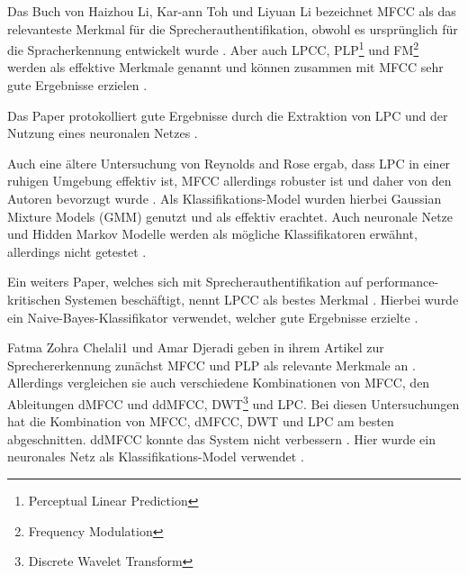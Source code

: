 Das Buch  von Haizhou Li, Kar-ann Toh und Liyuan Li bezeichnet \ac{MFCC} als das relevanteste Merkmal für die Sprecherauthentifikation, obwohl es ursprünglich für die Spracherkennung entwickelt wurde \autocite[vgl.][S. 7, 51]{li_advanced_2011}.
Aber auch \ac{LPCC}, PLP\footnote{Perceptual Linear Prediction} und FM\footnote{Frequency Modulation} werden als effektive Merkmale genannt und können zusammen mit \ac{MFCC} sehr gute Ergebnisse erzielen \autocite[vgl.][S. 6, 67]{li_advanced_2011}.

Das Paper  protokolliert gute Ergebnisse durch die Extraktion von \ac{LPC} und der Nutzung eines neuronalen Netzes \autocite[vgl.][S. 9]{kumar_rajeev_multilingual_2009}.

Auch eine ältere Untersuchung von Reynolds and Rose ergab, dass \ac{LPC} in einer ruhigen Umgebung effektiv ist, \ac{MFCC} allerdings robuster ist und daher von den Autoren bevorzugt wurde \autocite[vgl.][S. 2f]{reynolds_robust_1995}.
Als Klassifikations-Model wurden hierbei Gaussian Mixture Models (GMM) genutzt und als effektiv erachtet.
Auch neuronale Netze und Hidden Markov Modelle werden als mögliche Klassifikatoren erwähnt, allerdings nicht getestet \autocite[vgl.][S. 2f, 11]{reynolds_robust_1995}.

Ein weiters Paper, welches sich mit Sprecherauthentifikation auf performance-kritischen Systemen beschäftigt, nennt \ac{LPCC} als bestes Merkmal \autocite[vgl.][S. 7]{thullier_text-independent_2017}.
Hierbei wurde ein Naive-Bayes-Klassifikator verwendet, welcher gute Ergebnisse erzielte \autocite[vgl.][S. 18f]{thullier_text-independent_2017}.

Fatma Zohra Chelali1 und Amar Djeradi geben in ihrem Artikel zur Sprechererkennung zunächst \ac{MFCC} und PLP als relevante Merkmale an \autocite[vgl.][S. 276]{chelali_text_2017}.
Allerdings vergleichen sie auch verschiedene Kombinationen von \ac{MFCC}, den Ableitungen \ac{dMFCC} und \ac{ddMFCC}, DWT\footnote{Discrete Wavelet Transform} und \ac{LPC}.
Bei diesen Untersuchungen hat die Kombination von \ac{MFCC}, \ac{dMFCC}, DWT und \ac{LPC} am besten abgeschnitten.
\ac{ddMFCC} konnte das System nicht verbessern \autocite[vgl.][S. 276, 739]{chelali_text_2017}.
Hier wurde ein neuronales Netz als Klassifikations-Model verwendet \autocite[vgl.][S. 735]{chelali_text_2017}.

